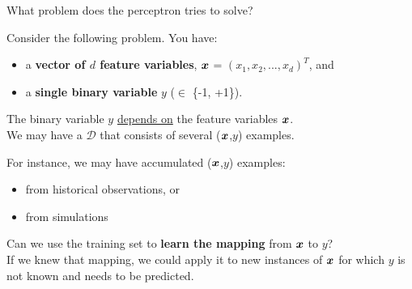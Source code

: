 \begin{frame}[t]{What problem does the perceptron tries to solve?}

    Consider the following problem. You have:
    \begin{itemize}
        \item a {\bf vector of $d$ feature variables}, $\boldsymbol{x}$ = $(x_1, x_2, ..., x_d)^T$, and
        \item a {\bf single binary variable} $y$ ($\in$ \{-1, +1\}).   
    \end{itemize}
    The binary variable $y$ \underline{depends on} the feature variables $\boldsymbol{x}$.\\
    \vspace{0.4cm}
    We may have a  $\mathcal{D}$ that 
    consists of several ($\boldsymbol{x}$,$y$) examples.\\
    \begin{blockexample}{}
        \small
        For instance, we may have accumulated ($\boldsymbol{x}$,$y$) examples:
        \begin{itemize}
            \small
            \item from historical observations, or
            \item from simulations
        \end{itemize}
    \end{blockexample}  
    \vspace{0.2cm}
    Can we use the training set to {\bf learn the mapping} from $\boldsymbol{x}$ to $y$?\\
    \vspace{0.2cm}
    If we knew that mapping, we could apply it to new instances of $\boldsymbol{x}$
    for which $y$ is not known and needs to be predicted.
\end{frame}

%
%
%

